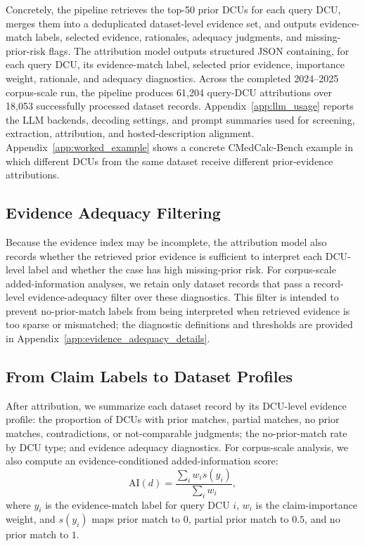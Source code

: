 \documentclass[11pt]{article}
\begin{document}
Concretely, the pipeline retrieves the top-50 prior DCUs for each query DCU, merges them into a deduplicated dataset-level evidence set, and outputs evidence-match labels, selected evidence, rationales, adequacy judgments, and missing-prior-risk flags.
The attribution model outputs structured JSON containing, for each query DCU, its evidence-match label, selected prior evidence, importance weight, rationale, and adequacy diagnostics.
Across the completed 2024--2025 corpus-scale run, the pipeline produces 61,204 query-DCU attributions over 18,053 successfully processed dataset records.
Appendix~\ref{app:llm_usage} reports the LLM backends, decoding settings, and prompt summaries used for screening, extraction, attribution, and hosted-description alignment.
Appendix~\ref{app:worked_example} shows a concrete CMedCalc-Bench example in which different DCUs from the same dataset receive different prior-evidence attributions.
\subsection{Evidence Adequacy Filtering}
\label{sec:evidence_adequacy}

Because the evidence index may be incomplete, the attribution model also records whether the retrieved prior evidence is sufficient to interpret each DCU-level label and whether the case has high missing-prior risk.
For corpus-scale added-information analyses, we retain only dataset records that pass a record-level evidence-adequacy filter over these diagnostics.
This filter is intended to prevent no-prior-match labels from being interpreted when retrieved evidence is too sparse or mismatched; the diagnostic definitions and thresholds are provided in Appendix~\ref{app:evidence_adequacy_details}.
\subsection{From Claim Labels to Dataset Profiles}
\label{sec:dataset_profiles}

After attribution, we summarize each dataset record by its DCU-level evidence profile: the proportion of DCUs with prior matches, partial matches, no prior matches, contradictions, or not-comparable judgments; the no-prior-match rate by DCU type; and evidence adequacy diagnostics.
For corpus-scale analysis, we also compute an evidence-conditioned added-information score:
\begin{equation}
    \mathrm{AI}(d) =
    \frac{\sum_i w_i s(y_i)}{\sum_i w_i},
\end{equation}
where $y_i$ is the evidence-match label for query DCU $i$, $w_i$ is the claim-importance weight, and $s(y_i)$ maps prior match to $0$, partial prior match to $0.5$, and no prior match to $1$.
\end{document}
